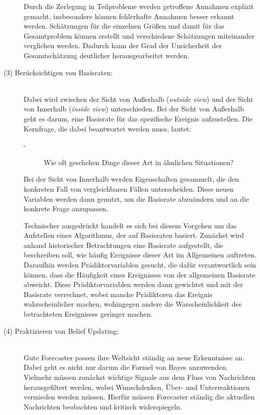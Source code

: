 \begin{description}
Durch die Zerlegung in Teilprobleme werden getroffene Annahmen explizit gemacht, insbesondere können
fehlerhafte Annahmen besser erkannt werden. Schätzungen für die einzelnen Größen und damit für das Gesamtproblem
können erstellt und verschiedene Schätzungen miteinander verglichen werden. Dadurch kann der Grad der Unsicherheit
der Gesamtschätzung deutlicher herausgearbeitet werden.

\item[(3) Berücksichtigen von Basisraten:] \hfill \\
Dabei wird zwischen der Sicht von Außerhalb (\emph{outside view}) und der Sicht von Innerhalb (\emph{inside view})
unterschieden. Bei der Sicht von Außerhalb geht es darum, eine Basisrate für das spezifische Ereignis aufzustellen.
Die Kernfrage, die dabei beantwortet werden muss, lautet:

\begin{description}
\item[-] Wie oft geschehen Dinge dieser Art in ähnlichen Situationen?
\end{description}

Bei der Sicht von Innerhalb werden Eigenschaften gesammelt, die den konkreten Fall von vergleichbaren Fällen
unterscheiden. Diese neuen Variablen werden dann genutzt, um die Basisrate abzuändern und an die konkrete
Frage anzupassen.

Technischer ausgedrückt handelt es sich bei diesem Vorgehen um das Aufstellen eines Algorithmus, der auf Basisraten
basiert. Zunächst wird anhand historischer Betrachtungen eine Basisrate aufgestellt, die
beschreiben soll, wie häufig Ereignisse dieser Art im Allgemeinen auftreten. Daraufhin werden Prädiktorvariablen gesucht, die
dafür verantwortlich sein können, dass die Häufigkeit eines Ereignisses von der allgemeinen Basisrate abweicht. Diese
Prädiktorvariablen werden dann gewichtet und mit der Basisrate verrechnet, wobei manche Prädiktoren das Ereignis wahrscheinlicher
machen, wohingegen andere die Warscheinlichkeit des betrachteten Ereignisses geringer machen.

\item[(4) Praktizieren von Belief Updating:] \hfill \\
Gute Forecaster passen ihre Weltsicht ständig an neue Erkenntnisse an. Dabei geht es nicht nur darum die Formel von Bayes
 anzuwenden. Vielmehr müssen zunächst wichtige Signale aus dem Fluss von Nachrichten herausgefiltert werden, wobei
Wunschdenken, Über- und Unterreaktionen vermieden werden müssen. Hierfür müssen Forecaster ständig die aktuellen Nachrichten beobachten 
und kritisch widerspiegeln.


\end{description}
